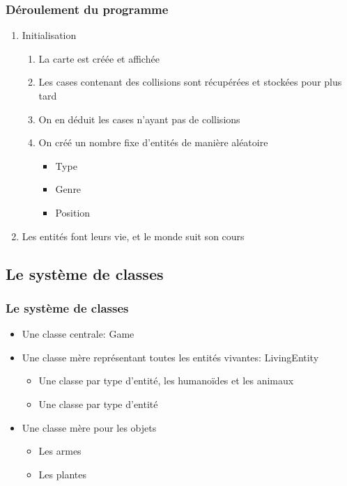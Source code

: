 \documentclass{beamer}
\begin{document}
\begin{frame} \frametitle{Déroulement du programme}
	\begin{enumerate}
		\item Initialisation
			\begin{enumerate}
				\item La carte est créée et affichée
				\item Les cases contenant des collisions sont récupérées et stockées pour plus tard
				\item On en déduit les cases n'ayant pas de collisions
				\item On créé un nombre fixe d'entités de manière aléatoire
					\begin{itemize}
						\item Type
						\item Genre
						\item Position
					\end{itemize}
			\end{enumerate}
		\item Les entités font leurs vie, et le monde suit son cours
	\end{enumerate}
\end{frame}

\subsection{Le système de classes}

\begin{frame} \frametitle{Le système de classes}
	\begin{itemize}
		\item Une classe centrale: Game
		\item Une classe mère représentant toutes les entités vivantes: LivingEntity
			\begin{itemize}
				\item Une classe par type d'entité, les humanoïdes et les animaux
				\item Une classe par type d'entité	
			\end{itemize}
		\item Une classe mère pour les objets
			\begin{itemize}
				\item Les armes
				\item Les plantes
			\end{itemize}
	\end{itemize}
\end{frame}
\end{document}
